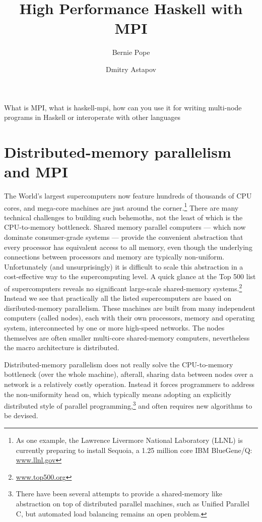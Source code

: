 \documentclass{tmr}
\title{High Performance Haskell with MPI}
\author{Bernie Pope\email{bjpope@unimelb.edu.au}}
\author{Dmitry Astapov\email{dastapov@gmail.com}}
\begin{document}
\begin{introduction} 
What is MPI, what is haskell-mpi, how can you use it for writing multi-node programs in Haskell or interoperate with other languages
\end{introduction}

\section{Distributed-memory parallelism and MPI}

The World's largest supercomputers now feature hundreds of thousands of CPU cores, and mega-core machines
are just around the corner.\footnote{As one example, the Lawrence Livermore National Laboratory (LLNL) 
is currently
preparing to install Sequoia, a 1.25 million core IBM BlueGene/Q: \url{www.llnl.gov}} There are many technical
challenges to building such behemoths, not the least of which is
the CPU-to-memory bottleneck. Shared memory parallel computers --- which now dominate consumer-grade
systems --- provide the convenient abstraction that every processor has equivalent access to all memory,
even though the underlying connections between processors and memory are typically non-uniform.
Unfortunately (and unsurprisingly) it is difficult to scale this abstraction in a
cost-effective way to the supercomputing level. A quick glance at the Top 500 list of supercomputers reveals
no significant large-scale shared-memory systems.\footnote{\url{www.top500.org}}
Instead we see that practically all the listed supercomputers are based on
disributed-memory parallelism. These machines are built from many independent computers (called nodes),
each with their own processors, memory and operating system, interconnected by one or more high-speed networks.
The nodes themselves are often smaller multi-core shared-memory computers, nevertheless
the macro architecture is distributed.

Distributed-memory parallelism does not really solve the CPU-to-memory bottleneck (over the whole machine),
afterall, sharing data between nodes over a network is a relatively costly operation.
Instead it forces programmers to
address the non-uniformity head on, which typically means adopting an explicitly distributed style of
parallel programming,\footnote{There have been several attempts to provide a shared-memory like abstraction
on top of distributed parallel machines, such as Unified Parallel C, but automated load balancing remains
an open problem.} and often requires new algorithms to be devised.
\end{document}
